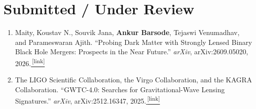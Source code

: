 \documentclass[a4paper,11pt]{article}
\newcommand{\publication}[2]{\item #1\href{#2}{\,\textsuperscript{[link]}}}
\newcommand{\myfullname}{\textbf{Ankur Barsode}}
\begin{document}
\section{Submitted / Under Review}
\begin{enumerate}
\publication{Maity, Koustav N., Souvik Jana, \myfullname, Tejaswi Venumadhav, and Parameswaran Ajith. ``Probing Dark Matter with Strongly Lensed Binary Black Hole Mergers: Prospects in the Near Future.'' \textit{arXiv}, arXiv:2609.05020, 2026.}{https://arxiv.org/abs/2609.05020}
\publication{The LIGO Scientific Collaboration, the Virgo Collaboration, and the KAGRA Collaboration. ``GWTC-4.0: Searches for Gravitational-Wave Lensing Signatures.'' \textit{arXiv}, arXiv:2512.16347, 2025.}{https://arxiv.org/abs/2512.16347}
\end{enumerate}
\end{document}
